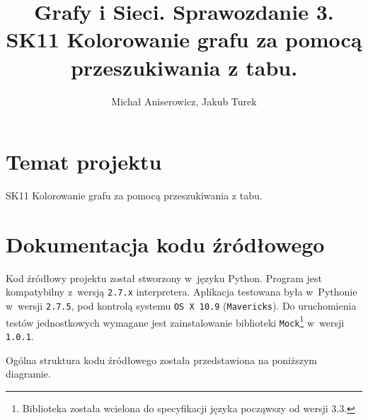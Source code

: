 \documentclass[a4paper,10pt]{article}
\title{Grafy i Sieci. Sprawozdanie 3. \\ \small{SK11 Kolorowanie grafu za pomocą przeszukiwania z tabu.}}
\author{Michał Aniserowicz, Jakub Turek}
\date{}
\begin{document}
\maketitle

\section*{Temat projektu}

SK11 Kolorowanie grafu za pomocą przeszukiwania z tabu.

\section*{Dokumentacja kodu źródłowego}

Kod źródłowy projektu został stworzony w~języku Python. Program jest kompatybilny z~wersją \verb+2.7.x+ interpretera. Aplikacja testowana była w~Pythonie w~wersji \verb+2.7.5+, pod kontrolą systemu \verb+OS X 10.9+ (\verb+Mavericks+). Do uruchomienia testów jednostkowych wymagane jest zainstalowanie biblioteki \verb+Mock+\footnote{Biblioteka została wcielona do specyfikacji języka począwszy od wersji 3.3.} w~wersji \verb+1.0.1+.

Ogólna struktura kodu źródłowego została przedstawiona na poniższym diagramie.

\end{document}
